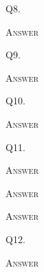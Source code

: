 Q8. 

\textsc{Answer}
\begin{answercode}

\end{answercode}


\newpage
Q9. 

\textsc{Answer}
\begin{answercode}

\end{answercode}




Q10. 

\textsc{Answer}
\begin{answercode}

\end{answercode}


\newpage
Q11. 

\textsc{Answer}
\begin{answercode}

\end{answercode}




\newpage



\newpage


\textsc{Answer}
\begin{answercode}

\end{answercode}




\newpage


\textsc{Answer}
\begin{answercode}

\end{answercode}


\newpage
Q12. 

\textsc{Answer}
\begin{answercode}

\end{answercode}


